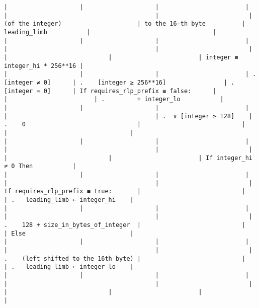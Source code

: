 \documentclass[varwidth=\maxdimen,margin=0.5cm,multi={verbatim}]{standalone}
\begin{document}
\begin{verbatim}
|                    |                    |                        |                         |                                         |                         | (of the integer)                     | to the 16-th byte          | leading_limb           |                                  |
|                    |                    |                        |                         |                                         |                         |                                      |                            |                        | integer ≡   integer_hi * 256**16 |
|                    |                    |                        | .    [integer ≠ 0]      | .    [integer ≥ 256**16]                | .    [integer = 0]      | If requires_rlp_prefix ≡ false:      |                            |                        | .         + integer_lo           |
|                    |                    |                        |                         |                                         | .  ∨ [integer ≥ 128]    | .    0                               |                            |                        |                                  |
|                    |                    |                        |                         |                                         |                         |                                      |                            |                        | If integer_hi ≠ 0 Then           |
|                    |                    |                        |                         |                                         |                         | If requires_rlp_prefix ≡ true:       |                            |                        | .   leading_limb ← integer_hi    |
|                    |                    |                        |                         |                                         |                         | .    128 + size_in_bytes_of_integer  |                            |                        | Else                             |
|                    |                    |                        |                         |                                         |                         | .    (left shifted to the 16th byte) |                            |                        | .   leading_limb ← integer_lo    |
|                    |                    |                        |                         |                                         |                         |                                      |                            |                        |                                  |

\end{verbatim}
\end{document}

